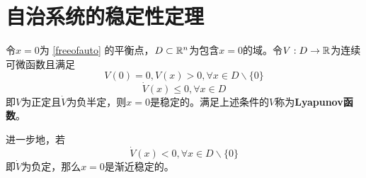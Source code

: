 \section{自治系统的稳定性定理}\label{2Cref}
\begin{theorem}[Lyapunov稳定性定理]\label{lyapunov}
  令$x=0$为 \eqref{freeofauto} 的平衡点，$D\subset\mathbb{R}{}^n$为包含$x=0$的域。令$V:D\to\mathbb{R}$为连续可微函数且满足
    \begin{equation}\label{VPD}
      V(0)=0,V(x)>0,\forall x\in D\backslash\{0\}
    \end{equation}
    \begin{equation}\label{VdotNSD}
      \dot{V}(x)\le 0,\forall x\in D
    \end{equation}
  即$V$为正定且$\dot{V}$为负半定，则$x=0$是稳定的。满足上述条件的$V$称为{\bf Lyapunov函数}。
  
  进一步地，若\begin{equation}\label{VdotND}
    \dot{V}(x)< 0,\forall x\in D\backslash\{0\}
  \end{equation}即$\dot{V}$为负定，那么$x=0$是渐近稳定的。
\end{theorem}

